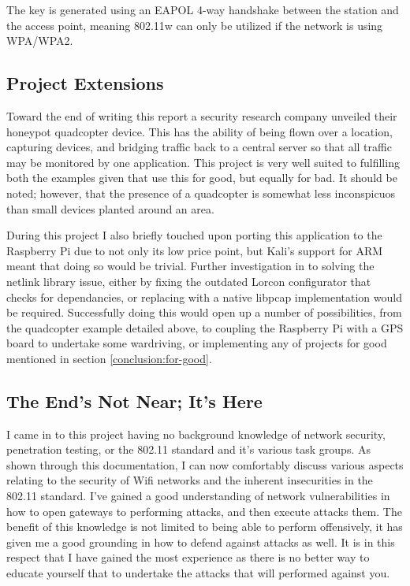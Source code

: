 The key is generated using an EAPOL 4-way handshake between the station and the access point, meaning 802.11w can only be utilized if the network is using WPA/WPA2.

\subsection{Project Extensions}

Toward the end of writing this report a security research company unveiled their honeypot quadcopter device. This has the ability of being flown over a location, capturing devices, and bridging traffic back to a central server so that all traffic may be monitored by one application. This project is very well suited to fulfilling both the examples given that use this for good, but equally for bad. It should be noted; however, that the presence of a quadcopter is somewhat less inconspicuos than small devices planted around an area. 

During this project I also briefly touched upon porting this application to the Raspberry Pi due to not only its low price point, but Kali's support for ARM meant that doing so would be trivial. Further investigation in to solving the netlink library issue, either by fixing the outdated Lorcon configurator that checks for dependancies, or replacing with a native libpcap implementation would be required. Successfully doing this would open up a number of possibilities, from the quadcopter example detailed above, to coupling the Raspberry Pi with a GPS board to undertake some wardriving, or implementing any of projects for good mentioned in section \ref{conclusion:for-good}.
\newpage
\subsection{The End's Not Near; It's Here}
I came in to this project having no background knowledge of network security, penetration testing, or the 802.11 standard and it’s various task groups. As shown through this documentation, I can now comfortably discuss various aspects relating to the security of Wifi networks and the inherent insecurities in the 802.11 standard. I’ve gained a good understanding of network vulnerabilities in how to open gateways to performing attacks, and then execute attacks them. The benefit of this knowledge is not limited to being able to perform offensively, it has given me a good grounding in how to defend against attacks as well. It is in this respect that I have gained the most experience as there is no better way to educate yourself that to undertake the attacks that will performed against you.

